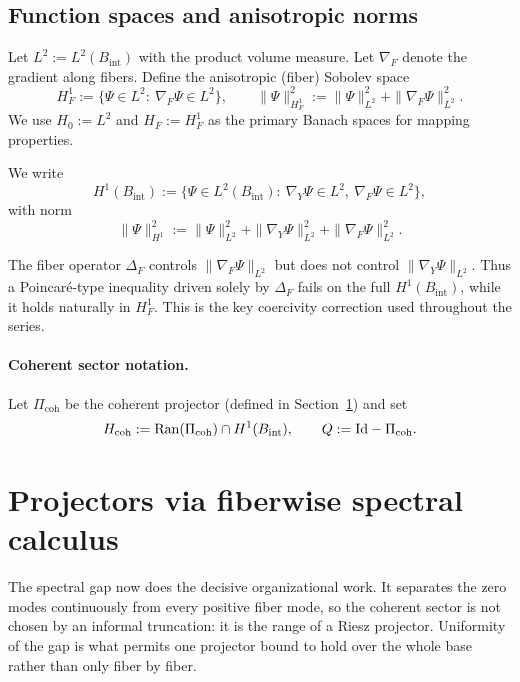 \documentclass[11pt]{article}
\providecommand{\Bint}{B_{\mathrm{int}}}
\providecommand{\PiCoh}{\Pi_{\mathrm{coh}}}
\providecommand{\Hcoh}{H_{\mathrm{coh}}}
\providecommand{\Qop}{Q}
\providecommand{\Ran}{\mathrm{Ran}}
\begin{document}
\subsection{Function spaces and anisotropic norms}

Let $L^2 := L^2(\Bint)$ with the product volume measure. Let $\nabla_F$ denote the gradient along fibers.
Define the anisotropic (fiber) Sobolev space
\[
H^1_F := \{\Psi\in L^2:\ \nabla_F\Psi\in L^2\},
\qquad
\|\Psi\|_{H^1_F}^2 := \|\Psi\|_{L^2}^2 + \|\nabla_F\Psi\|_{L^2}^2.
\]
We use $H_0 := L^2$ and $H_F := H^1_F$ as the primary Banach spaces for mapping properties.

\begin{definition}
We write
\[
H^1(\Bint)
:=
\big\{\Psi\in L^2(\Bint):\ \nabla_Y\Psi\in L^2,\ \nabla_F\Psi\in L^2\big\},
\]
with norm
\[
\|\Psi\|_{H^1}^2 := \|\Psi\|_{L^2}^2 + \|\nabla_Y\Psi\|_{L^2}^2 + \|\nabla_F\Psi\|_{L^2}^2.
\]
\end{definition}

\begin{remark}
The fiber operator $\Delta_F$ controls $\|\nabla_F\Psi\|_{L^2}$ but does not control $\|\nabla_Y\Psi\|_{L^2}$.
Thus a Poincar\'e-type inequality driven solely by $\Delta_F$ fails on the full $H^1(\Bint)$, while it holds naturally in $H^1_F$.
This is the key coercivity correction used throughout the series.
\end{remark}

\paragraph{Coherent sector notation.}
Let $\PiCoh$ be the coherent projector (defined in Section~\ref{sec:projectors}) and set
\[
\Hcoh := \Ran(\PiCoh)\cap H^1(\Bint),\qquad \Qop := \Id - \PiCoh.
\]

\section{Projectors via fiberwise spectral calculus}\label{sec:projectors}

The spectral gap now does the decisive organizational work.  It separates
the zero modes continuously from every positive fiber mode, so the coherent
sector is not chosen by an informal truncation: it is the range of a Riesz
projector.  Uniformity of the gap is what permits one projector bound to hold
over the whole base rather than only fiber by fiber.
\end{document}
